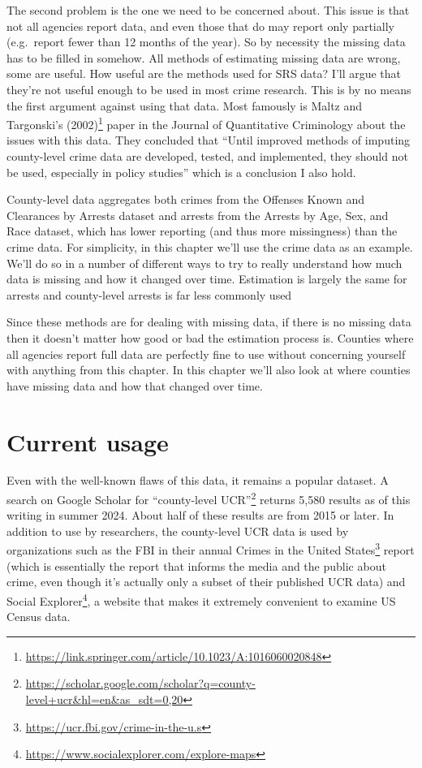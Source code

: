 \documentclass[
]{krantz}
\renewcommand{\href}[2]{#2\footnote{\url{#1}}}
\begin{document}
The second problem is the one we need to be concerned about.
This issue is that not all agencies report data, and even
those that do may report only partially (e.g.~report fewer
than 12 months of the year). So by necessity the missing
data has to be filled in somehow. All methods of estimating
missing data are wrong, some are useful. How useful are the
methods used for SRS data? I'll argue that they're not
useful enough to be used in most crime research. This is by
no means the first argument against using that data. Most
famously is
\href{https://link.springer.com/article/10.1023/A:1016060020848}{Maltz
and Targonski's (2002)} paper in the Journal of Quantitative
Criminology about the issues with this data. They concluded
that ``Until improved methods of imputing county-level crime
data are developed, tested, and implemented, they should not
be used, especially in policy studies'' which is a
conclusion I also hold.

County-level data aggregates both crimes from the Offenses
Known and Clearances by Arrests dataset and arrests from the
Arrests by Age, Sex, and Race dataset, which has lower
reporting (and thus more missingness) than the crime data.
For simplicity, in this chapter we'll use the crime data as
an example. We'll do so in a number of different ways to try
to really understand how much data is missing and how it
changed over time. Estimation is largely the same for
arrests and county-level arrests is far less commonly used

Since these methods are for dealing with missing data, if
there is no missing data then it doesn't matter how good or
bad the estimation process is. Counties where all agencies
report full data are perfectly fine to use without
concerning yourself with anything from this chapter. In this
chapter we'll also look at where counties have missing data
and how that changed over time.

\section{Current usage}\label{current-usage}

Even with the well-known flaws of this data, it remains a
popular dataset. A search on Google Scholar for
\href{https://scholar.google.com/scholar?q=county-level+ucr&hl=en&as_sdt=0,20}{``county-level
UCR''} returns 5,580 results as of this writing in summer
2024. About half of these results are from 2015 or later. In
addition to use by researchers, the county-level UCR data is
used by organizations such as the FBI in their annual
\href{https://ucr.fbi.gov/crime-in-the-u.s}{Crimes in the
United States} report (which is essentially the report that
informs the media and the public about crime, even though
it's actually only a subset of their published UCR data) and
\href{https://www.socialexplorer.com/explore-maps}{Social
Explorer}, a website that makes it extremely convenient to
examine US Census data.
\end{document}
